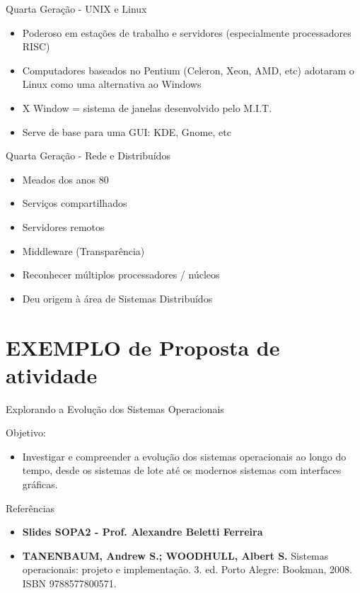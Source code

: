 \documentclass{beamer}
\begin{document}
  \begin{frame}{Quarta Geração - UNIX e Linux}
      \begin{itemize}
          \item Poderoso em estações de trabalho e servidores (especialmente processadores RISC)
          \item Computadores baseados no Pentium (Celeron, Xeon, AMD, etc) adotaram o Linux como uma alternativa ao Windows
          \item X Window = sistema de janelas desenvolvido pelo M.I.T.
          \item Serve de base para uma GUI: KDE, Gnome, etc
      \end{itemize}
  \end{frame}
  \begin{frame}{Quarta Geração - Rede e Distribuídos}
      \begin{itemize}
          \item Meados dos anos 80
          \item Serviços compartilhados
          \item Servidores remotos
          \item Middleware (Transparência)
          \item Reconhecer múltiplos processadores / núcleos
          \item Deu origem à área de Sistemas Distribuídos
      \end{itemize}
  \end{frame}
  





\section{EXEMPLO de Proposta de atividade}

\begin{frame}{Explorando a Evolução dos Sistemas Operacionais}

      Objetivo:
      \begin{itemize}
            \item  Investigar e compreender a evolução dos sistemas operacionais ao longo do tempo, desde os sistemas de lote até os modernos sistemas com interfaces gráficas.
      \end{itemize}
      
\end{frame}

\begin{frame}{Referências}\justifying
      \begin{itemize}
            \item \textbf{Slides SOPA2 - Prof. Alexandre Beletti Ferreira}
            \item \textbf{TANENBAUM, Andrew S.; WOODHULL, Albert S.} Sistemas operacionais: projeto e implementação. 3. ed. Porto Alegre: Bookman, 2008. ISBN 9788577800571.
      \end{itemize}
\end{frame}
\end{document}
